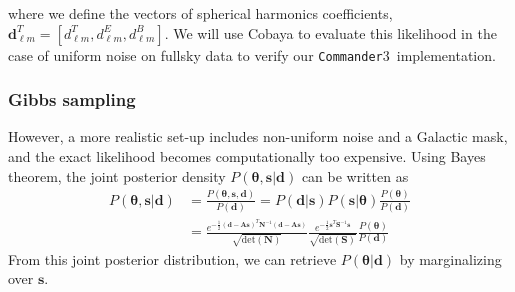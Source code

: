 \documentclass[twocolumn]{../common/aa}
\def\commander{\texttt{Commander}}
\begin{document}
where we define the vectors of spherical harmonics coefficients, ${\boldsymbol{d}_{\ell m}^T = [d^T_{\ell m}, d^E_{\ell m}, d^B_{\ell m}]}$. We will use Cobaya \citep{Torrado:2020dgo} to evaluate this likelihood in the case of uniform noise on fullsky data to verify our \commander3\ implementation.

\subsubsection{Gibbs sampling}
\label{sec:gibbs}

However, a more realistic set-up includes non-uniform noise and a Galactic mask, and the exact likelihood becomes computationally too expensive. Using Bayes theorem, the joint posterior density $P(\boldsymbol{\theta}, \boldsymbol{s} | \boldsymbol{d})$ can be written as
\begin{align}
    \nonumber
    P(\boldsymbol{\theta}, \boldsymbol{s} | \boldsymbol{d}) &= \frac{P(\boldsymbol{\theta}, \boldsymbol{s}, \boldsymbol{d})}{P(\boldsymbol{d})} = P(\boldsymbol{d} | \boldsymbol{s})P(\boldsymbol{s}| \boldsymbol{\theta})\frac{P(\boldsymbol{\theta})}{P(\boldsymbol{d})}\\
    \label{eq:joint-posterior}
    &= \frac{e^{-\frac12 \left(\boldsymbol{d}-\boldsymbol{A}\boldsymbol{s} \right)^T \boldsymbol{N}^{-1}\left(\boldsymbol{d}-\boldsymbol{A}\boldsymbol{s} \right)}}{\sqrt{\mathrm{det}\left(\boldsymbol{N}\right)}}
    \frac{e^{-\frac12 \boldsymbol{s}^T \boldsymbol{S}^{-1}\boldsymbol{s}}}{\sqrt{\mathrm{det}\left(\boldsymbol{S}\right)}}\frac{P(\boldsymbol{\theta})}{P(\boldsymbol{d})}
\end{align}
From this joint posterior distribution, we can retrieve $P(\boldsymbol{\theta} | \boldsymbol{d})$ by marginalizing over $\boldsymbol{s}$.
\end{document}

